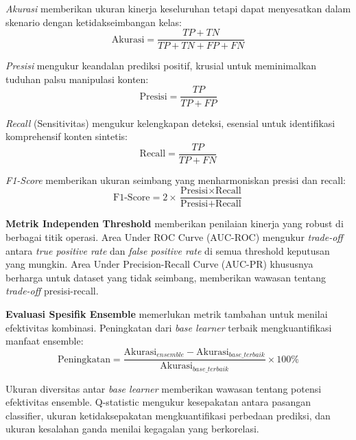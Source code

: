 \textit{Akurasi} memberikan ukuran kinerja keseluruhan tetapi dapat menyesatkan dalam skenario dengan ketidakseimbangan kelas:
\begin{equation}
\text{Akurasi} = \frac{TP + TN}{TP + TN + FP + FN}
\label{eq:accuracy}
\end{equation}

\textit{Presisi} mengukur keandalan prediksi positif, krusial untuk meminimalkan tuduhan palsu manipulasi konten:
\begin{equation}
\text{Presisi} = \frac{TP}{TP + FP}
\label{eq:precision}
\end{equation}

\textit{Recall} (Sensitivitas) mengukur kelengkapan deteksi, esensial untuk identifikasi komprehensif konten sintetis:
\begin{equation}
\text{Recall} = \frac{TP}{TP + FN}
\label{eq:recall}
\end{equation}

\textit{F1-Score} memberikan ukuran seimbang yang menharmoniskan presisi dan recall:
\begin{equation}
\text{F1-Score} = 2 \times \frac{\text{Presisi} \times \text{Recall}}{\text{Presisi} + \text{Recall}}
\label{eq:f1score}
\end{equation}

\textbf{Metrik Independen Threshold} memberikan penilaian kinerja yang robust di berbagai titik operasi. Area Under ROC Curve (AUC-ROC) mengukur \textit{trade-off} antara \textit{true positive rate} dan \textit{false positive rate} di semua threshold keputusan yang mungkin. Area Under Precision-Recall Curve (AUC-PR) khususnya berharga untuk dataset yang tidak seimbang, memberikan wawasan tentang \textit{trade-off} presisi-recall.

\textbf{Evaluasi Spesifik Ensemble} memerlukan metrik tambahan untuk menilai efektivitas kombinasi. Peningkatan dari \textit{base learner} terbaik mengkuantifikasi manfaat ensemble:
\begin{equation}
\text{Peningkatan} = \frac{\text{Akurasi}_{ensemble} - \text{Akurasi}_{base\_terbaik}}{\text{Akurasi}_{base\_terbaik}} \times 100\%
\label{eq:ensemble_improvement}
\end{equation}

Ukuran diversitas antar \textit{base learner} memberikan wawasan tentang potensi efektivitas ensemble. Q-statistic mengukur kesepakatan antara pasangan classifier, ukuran ketidaksepakatan mengkuantifikasi perbedaan prediksi, dan ukuran kesalahan ganda menilai kegagalan yang berkorelasi.

